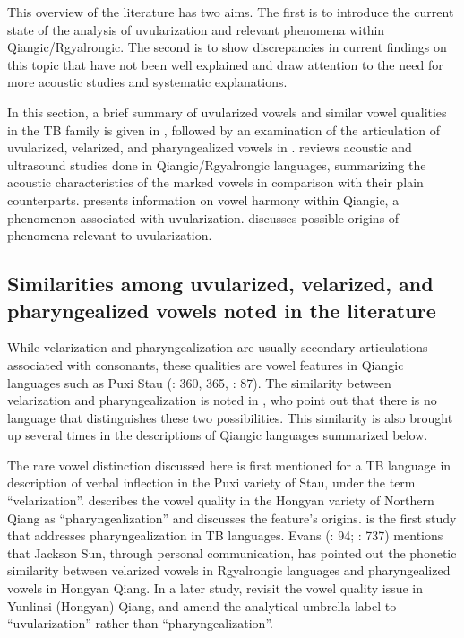 \documentclass[output=paper]{langscibook}
\begin{document}
  This overview of the literature has two aims. The first is to introduce the current state of the analysis of uvularization and relevant phenomena within Qiangic/Rgyalrongic. The second is to show discrepancies in current findings on this topic that have not been well explained and draw attention to the need for more acoustic studies and systematic explanations. 

In this section, a brief summary of uvularized vowels and similar vowel qualities in the TB family is given in , followed by an examination of the articulation of uvularized, velarized, and pharyngealized vowels in .  reviews acoustic and ultrasound studies done in Qiangic/Rgyalrongic languages, summarizing the acoustic characteristics of the marked vowels in comparison with their plain counterparts.  presents information on vowel harmony within Qiangic, a phenomenon associated with uvularization.  discusses possible origins of phenomena relevant to uvularization.

\subsection{Similarities among uvularized, velarized, and pharyngealized vowels noted in the literature}\label{sec:guan:3.1}

While velarization and pharyngealization are usually secondary articulations associated with consonants, these qualities are vowel features in Qiangic languages such as Puxi Stau (\citealt{LadefogedMaddieson1996}: 360, 365, \citealt{LinEtAl2012}: 87). The similarity between velarization and pharyngealization is noted in \citet[236]{LadefogedJohnson2011}, who point out that there is no language that distinguishes these two possibilities. This similarity is also brought up several times in the descriptions of Qiangic languages summarized below.

The rare vowel distinction discussed here is first mentioned for a TB language in  description of verbal inflection in the Puxi variety of Stau, under the term “velarization”. \citet{Evans2006a,Evans2006b} describes the vowel quality in the Hongyan variety of Northern Qiang as “pharyngealization” and discusses the feature’s origins. \citet{Evans2006b} is the first study that addresses pharyngealization in TB languages. Evans (\citeyear*{Evans2006a}: 94; \citeyear*{Evans2006b}: 737) mentions that Jackson Sun, through personal communication, has pointed out the phonetic similarity between velarized vowels in Rgyalrongic languages and pharyngealized vowels in Hongyan Qiang. In a later study, \citet{SunEvans2013} revisit the vowel quality issue in Yunlinsi (Hongyan) Qiang, and amend the analytical umbrella label to “uvularization” rather than “pharyngealization”.
\end{document}
